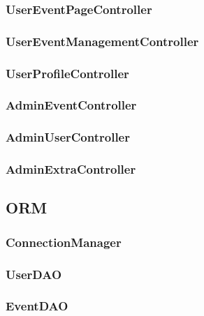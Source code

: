 \documentclass[11pt]{article}
\begin{document}
            \subsubsection{UserEventPageController} \label{subsubsec:user-event-page-controller}

            \subsubsection{UserEventManagementController} \label{subsubsec:user-event-management-controller}

            \subsubsection{UserProfileController} \label{subsubsec:user-profile-controller}

            \subsubsection{AdminEventController} \label{subsubsec:admin-event-controller}

            \subsubsection{AdminUserController} \label{subsubsec:admin-user-controller}

            \subsubsection{AdminExtraController} \label{subsubsec:admin-extra-controller}

        \subsection{ORM} \label{subsec:orm}

            \subsubsection{ConnectionManager} \label{subsubsec:connection-manager}

            \subsubsection{UserDAO} \label{subsubsec:user-dao}

            \subsubsection{EventDAO} \label{subsubsec:event-dao}
\end{document}
